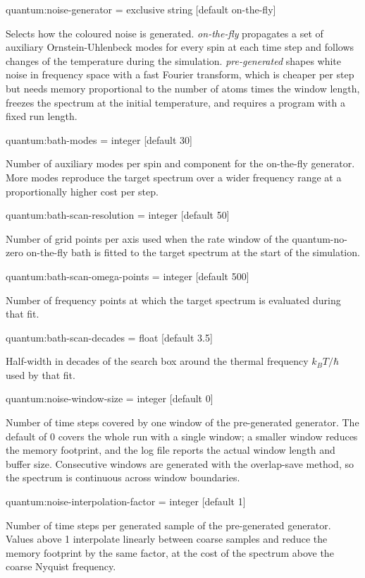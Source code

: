 {\zicf quantum:noise-generator = exclusive string [default on-the-fly]}
Selects how the coloured noise is generated. \textit{on-the-fly} propagates a set of auxiliary Ornstein-Uhlenbeck modes for every spin at each time step and follows changes of the temperature during the simulation. \textit{pre-generated} shapes white noise in frequency space with a fast Fourier transform, which is cheaper per step but needs memory proportional to the number of atoms times the window length, freezes the spectrum at the initial temperature, and requires a program with a fixed run length.

{\zicf quantum:bath-modes = integer [default 30]}
Number of auxiliary modes per spin and component for the on-the-fly generator. More modes reproduce the target spectrum over a wider frequency range at a proportionally higher cost per step.

{\zicf quantum:bath-scan-resolution = integer [default 50]}
Number of grid points per axis used when the rate window of the quantum-no-zero on-the-fly bath is fitted to the target spectrum at the start of the simulation.

{\zicf quantum:bath-scan-omega-points = integer [default 500]}
Number of frequency points at which the target spectrum is evaluated during that fit.

{\zicf quantum:bath-scan-decades = float [default 3.5]}
Half-width in decades of the search box around the thermal frequency $k_B T/\hbar$ used by that fit.

{\zicf quantum:noise-window-size = integer [default 0]}
Number of time steps covered by one window of the pre-generated generator. The default of 0 covers the whole run with a single window; a smaller window reduces the memory footprint, and the log file reports the actual window length and buffer size. Consecutive windows are generated with the overlap-save method, so the spectrum is continuous across window boundaries.

{\zicf quantum:noise-interpolation-factor = integer [default 1]}
Number of time steps per generated sample of the pre-generated generator. Values above 1 interpolate linearly between coarse samples and reduce the memory footprint by the same factor, at the cost of the spectrum above the coarse Nyquist frequency.

